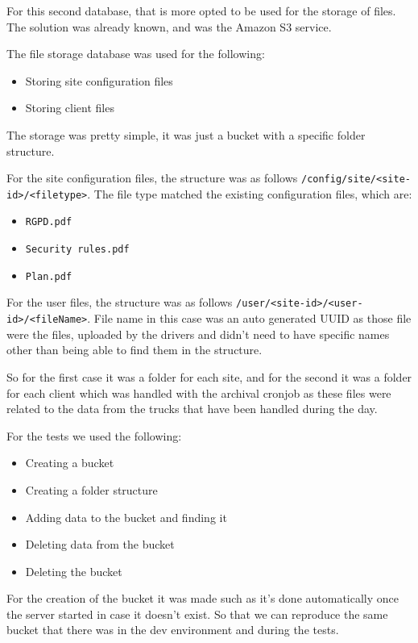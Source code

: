 For this second database, that is more opted to be used for the storage of files.
The solution was already known, and was the Amazon S3 service.

The file storage database was used for the following:

    \begin{itemize}
        \item Storing site configuration files
        \item Storing client files
    \end{itemize}

The storage was pretty simple, it was just a bucket with a specific folder structure.

For the site configuration files, the structure was as follows \texttt{/config/site/<site-id>/<filetype>}.
The file type matched the existing configuration files, which are:

    \begin{itemize}
        \item \texttt{RGPD.pdf}
        \item \texttt{Security rules.pdf}
        \item \texttt{Plan.pdf}
    \end{itemize}

For the user files, the structure was as follows \texttt{/user/<site-id>/<user-id>/<fileName>}.
File name in this case was an auto generated UUID as those file were the files, uploaded
by the drivers and didn't need to have specific names other than being able to find
them in the structure.

So for the first case it was a folder for each site,
and for the second it was a folder for each client which was handled with the archival
cronjob as these files were related to the data from the trucks that have been handled
during the day.

For the tests we used the following:

    \begin{itemize}
        \item Creating a bucket
        \item Creating a folder structure
        \item Adding data to the bucket and finding it
        \item Deleting data from the bucket
        \item Deleting the bucket
    \end{itemize}

For the creation of the bucket it was made such as it's done automatically once the
server started in case it doesn't exist.
So that we can reproduce the same bucket that there was in the dev environment and during
the tests.

